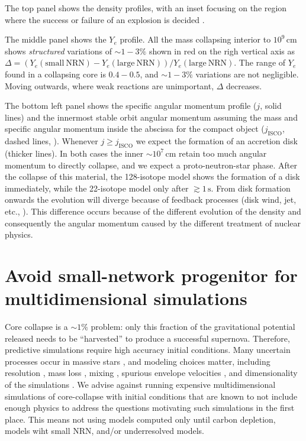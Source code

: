 \documentclass[twocolumn]{aastex63}
\begin{document}
The top panel shows the density profiles, with an inset focusing on
the region where the success or failure of an explosion is decided
\citep[e.g.,][]{ertl:16, boccioli:23, burrows:23}.

The middle panel shows the $Y_e$ profile. All the mass collapsing
interior to $10^9\,\mathrm{cm}$ shows \emph{structured} variations of
$\sim{}1-3\%$ shown in red on the righ vertical axis as
$\Delta=(Y_e(\mathrm{small\ NRN})-Y_e(\mathrm{large\
  NRN}))/Y_e(\mathrm{large\ NRN})$. The range of $Y_e$ found in a
collapsing core is $0.4-0.5$, and $\sim1-3\%$ variations are not
negligible. Moving outwards, where weak reactions are unimportant,
$\Delta$ decreases.

The bottom left panel shows the specific angular momentum profile
($j$, solid lines) and the innermost stable orbit angular momentum
assuming the mass and specific angular momentum inside the abscissa
for the compact object ($j_\mathrm{ISCO}$, dashed lines,
\citealt{bardeen:72}). Whenever $j\geq j_\mathrm{ISCO}$ we expect the
formation of an accretion disk (thicker lines). In both cases the
inner $\sim{}10^{7}\,\mathrm{cm}$ retain too much angular momentum to
directly collapse, and we expect a proto-neutron-star phase. After the
collapse of this material, the 128-isotope model shows the formation
of a disk immediately, while the 22-isotope model only after
$\gtrsim 1\,\mathrm{s}$. From disk formation onwards the evolution
will diverge because of feedback processes (disk wind, jet, etc.,
\citealt{gottlieb:22}). This difference occurs because of the
different evolution of the density and consequently the angular
momentum caused by the different treatment of nuclear physics.

\section{Avoid small-network progenitor for multidimensional
  simulations}

Core collapse is a $\sim{}1\%$ problem: only this fraction of the
gravitational potential released %
needs to be ``harvested'' %
to produce a successful supernova. Therefore,
predictive %
simulations require high accuracy initial conditions. Many uncertain
processes occur in massive stars \citep[e.g.,][]{woosley:02,
  langer:12}, and modeling choices matter, including resolution
\citep{farmer:16}, mass loss \citep{renzo:17}, mixing
\citep{davis:19}, spurious envelope velocities
\citep[e.g.,][]{farmer:16, aguilera-dena:18}, and dimensionality of
the simulations \citep[e.g.,][]{fields:22}. We advise against running
expensive multidimensional simulations of core-collapse with initial
conditions that are known to not include enough physics to address the
questions motivating such simulations in the first place. This means
not using models computed only until carbon depletion, models wiht
small NRN, and/or underresolved
models. %
\end{document}
